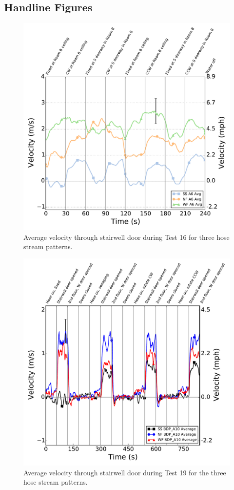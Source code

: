 \documentclass[12pt,oneside]{book}
\begin{document}
\subsection{Handline Figures}
\label{sec:handline_figs}

\begin{figure}[!ht]
	\includegraphics[width=\columnwidth]{../Figures/Plots/HOSE_IXAOXX_BDP_A6_stream_avgs}
	\caption{Average velocity through stairwell door during Test 16 for three hose stream patterns.}
	\label{fig:Test_34_BDP_A6_Avg_All}
\end{figure}
\FloatBarrier

\begin{figure}[!ht]
	\includegraphics[width=\columnwidth]{../Figures/Plots/Test_19_West_063014_BDP_A10_stream_avgs}
	\caption{Average velocity through stairwell door during Test 19 for the three hose stream patterns.}
	\label{fig:Test_19_BDP_A10_Avg_All}
\end{figure}

\clearpage
\end{document}
